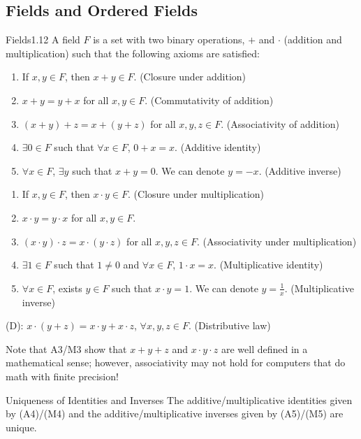 \subsection{Fields and Ordered Fields}
\begin{definition}{Fields}{1.12}
    A field $F$ is a set with two binary operations, $+$ and $\cdot$ (addition and multiplication) such that the following axioms are satisfied:
    \begin{enumerate}[start=1, label={(A\arabic*):}]
    \item If $x, y \in F$, then $x + y \in F$. (Closure under addition)
    \item $x + y = y + x$ for all $x, y \in F$. (Commutativity of addition)
    \item $(x+y) + z = x + (y + z)$ for all $x, y, z \in F$. (Associativity of addition)
    \item $\exists 0 \in F$ such that $\forall x \in F$, $0 + x = x$. (Additive identity)
    \item $\forall x \in F$, $\exists y$ such that $x + y = 0$. We can denote $y = -x$. (Additive inverse)
    \end{enumerate}
    \begin{enumerate}[start=1, label={(M\arabic*):}]
        \item If $x, y \in F$, then $x\cdot y\in F$. (Closure under multiplication)
        \item $x \cdot y = y \cdot x$ for all $x, y \in F$.
        \item $(x\cdot y)\cdot z = x \cdot (y \cdot z)$ for all $x, y, z \in F$. (Associativity under multiplication)
        \item $\exists 1 \in F$ such that $1 \neq 0$ and $\forall x \in F$, $1 \cdot x = x$. (Multiplicative identity)
        \item $\forall x \in F$, exists $y \in F$ such that $x \cdot y = 1$. We can denote $y = \frac{1}{x}$. (Multiplicative inverse)
    \end{enumerate}
    (D): $x \cdot (y + z) = x \cdot y + x \cdot z$, $\forall x, y, z \in F$. (Distributive law)
\end{definition}
\noindent Note that A3/M3 show that $x + y + z$ and $x\cdot y\cdot z$ are well defined in a mathematical sense; however, associativity may not hold for computers that do math with finite precision! 
\begin{ntheorem}{Uniqueness of Identities and Inverses}
    The additive/multiplicative identities given by (A4)/(M4) and the additive/multiplicative inverses given by (A5)/(M5) are unique. 
\end{ntheorem}
